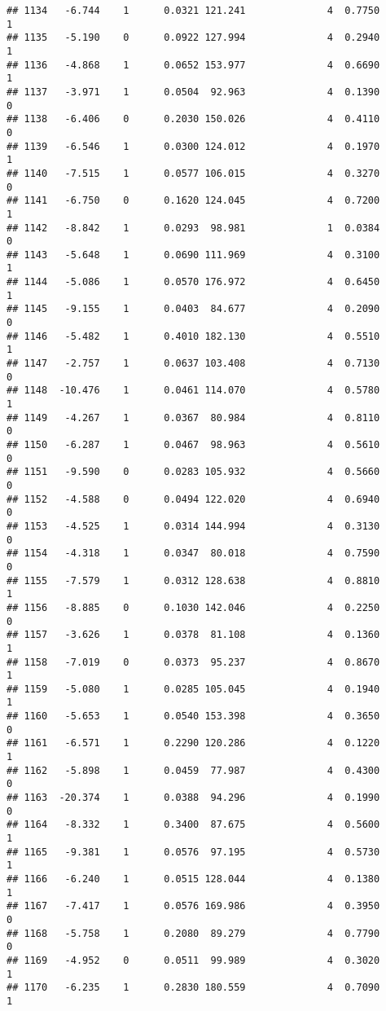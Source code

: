 \documentclass[
]{article}
\begin{document}
\begin{verbatim}
## 1134   -6.744    1      0.0321 121.241              4  0.7750      1
## 1135   -5.190    0      0.0922 127.994              4  0.2940      1
## 1136   -4.868    1      0.0652 153.977              4  0.6690      1
## 1137   -3.971    1      0.0504  92.963              4  0.1390      0
## 1138   -6.406    0      0.2030 150.026              4  0.4110      0
## 1139   -6.546    1      0.0300 124.012              4  0.1970      1
## 1140   -7.515    1      0.0577 106.015              4  0.3270      0
## 1141   -6.750    0      0.1620 124.045              4  0.7200      1
## 1142   -8.842    1      0.0293  98.981              1  0.0384      0
## 1143   -5.648    1      0.0690 111.969              4  0.3100      1
## 1144   -5.086    1      0.0570 176.972              4  0.6450      1
## 1145   -9.155    1      0.0403  84.677              4  0.2090      0
## 1146   -5.482    1      0.4010 182.130              4  0.5510      1
## 1147   -2.757    1      0.0637 103.408              4  0.7130      0
## 1148  -10.476    1      0.0461 114.070              4  0.5780      1
## 1149   -4.267    1      0.0367  80.984              4  0.8110      0
## 1150   -6.287    1      0.0467  98.963              4  0.5610      0
## 1151   -9.590    0      0.0283 105.932              4  0.5660      0
## 1152   -4.588    0      0.0494 122.020              4  0.6940      0
## 1153   -4.525    1      0.0314 144.994              4  0.3130      0
## 1154   -4.318    1      0.0347  80.018              4  0.7590      0
## 1155   -7.579    1      0.0312 128.638              4  0.8810      1
## 1156   -8.885    0      0.1030 142.046              4  0.2250      0
## 1157   -3.626    1      0.0378  81.108              4  0.1360      1
## 1158   -7.019    0      0.0373  95.237              4  0.8670      1
## 1159   -5.080    1      0.0285 105.045              4  0.1940      1
## 1160   -5.653    1      0.0540 153.398              4  0.3650      0
## 1161   -6.571    1      0.2290 120.286              4  0.1220      1
## 1162   -5.898    1      0.0459  77.987              4  0.4300      0
## 1163  -20.374    1      0.0388  94.296              4  0.1990      0
## 1164   -8.332    1      0.3400  87.675              4  0.5600      1
## 1165   -9.381    1      0.0576  97.195              4  0.5730      1
## 1166   -6.240    1      0.0515 128.044              4  0.1380      1
## 1167   -7.417    1      0.0576 169.986              4  0.3950      0
## 1168   -5.758    1      0.2080  89.279              4  0.7790      0
## 1169   -4.952    0      0.0511  99.989              4  0.3020      1
## 1170   -6.235    1      0.2830 180.559              4  0.7090      1

\end{verbatim}
\end{document}

